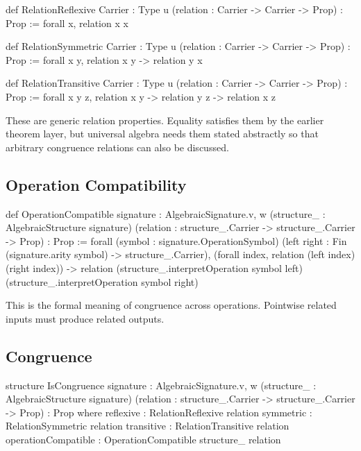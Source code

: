 \documentclass[11pt]{article}
\begin{document}
\begin{leanblock}
def RelationReflexive {Carrier : Type u}
    (relation : Carrier -> Carrier -> Prop) : Prop :=
  forall x, relation x x

def RelationSymmetric {Carrier : Type u}
    (relation : Carrier -> Carrier -> Prop) : Prop :=
  forall {x y}, relation x y -> relation y x

def RelationTransitive {Carrier : Type u}
    (relation : Carrier -> Carrier -> Prop) : Prop :=
  forall {x y z}, relation x y -> relation y z -> relation x z
\end{leanblock}

These are generic relation properties. Equality satisfies them by the earlier theorem layer, but universal algebra needs them stated abstractly so that arbitrary congruence relations can also be discussed.

\subsection{Operation Compatibility}

\begin{leanblock}
def OperationCompatible
    {signature : AlgebraicSignature.{v, w}}
    (structure_ : AlgebraicStructure signature)
    (relation : structure_.Carrier -> structure_.Carrier -> Prop) : Prop :=
  forall (symbol : signature.OperationSymbol)
    (left right : Fin (signature.arity symbol) -> structure_.Carrier),
      (forall index, relation (left index) (right index)) ->
        relation
          (structure_.interpretOperation symbol left)
          (structure_.interpretOperation symbol right)
\end{leanblock}

This is the formal meaning of congruence across operations. Pointwise related inputs must produce related outputs.

\subsection{Congruence}

\begin{leanblock}
structure IsCongruence
    {signature : AlgebraicSignature.{v, w}}
    (structure_ : AlgebraicStructure signature)
    (relation : structure_.Carrier -> structure_.Carrier -> Prop) : Prop where
  reflexive : RelationReflexive relation
  symmetric : RelationSymmetric relation
  transitive : RelationTransitive relation
  operationCompatible : OperationCompatible structure_ relation
\end{leanblock}
\end{document}
